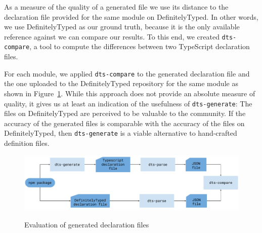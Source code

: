\documentclass[sigplan,screen]{acmart}
\newcommand{\figref}[1]{Figure~\ref{#1}}
\begin{document}
As a measure of the quality of a generated file we use its distance to
the declaration file provided for the same module on
DefinitelyTyped. In other words, we use DefinitelyTyped as our ground
truth, because it is the only available reference against we can
compare our results.
To this end, we created \texttt{dts-compare}, a tool to compute the
differences between two TypeScript declaration files.

For each module, we applied \texttt{dts-compare} to the generated declaration file and the
one uploaded to the DefinitelyTyped repository for the same module as shown in
\figref{fig:evaluation-diagram}. While this approach does not provide an absolute measure
of quality, it gives us at least an indication of the usefulness of \texttt{dts-generate}:
The files on DefinitelyTyped are perceived to be valuable to the community. If the accuracy
of the generated files is comparable with the accuracy of the files on DefinitelyTyped,
then \texttt{dts-generate} is a viable alternative to hand-crafted definition files.

\begin{figure}[tp]
  \begin{centering}
      {\includegraphics[width=1\linewidth]{evaluation-diagram.pdf}}
      \caption[Evaluation against DefinitelyTyped repository]{{Evaluation of
          generated declaration files
        }
} 
      \label{fig:evaluation-diagram}
  \end{centering}
\end{figure}
\end{document}
